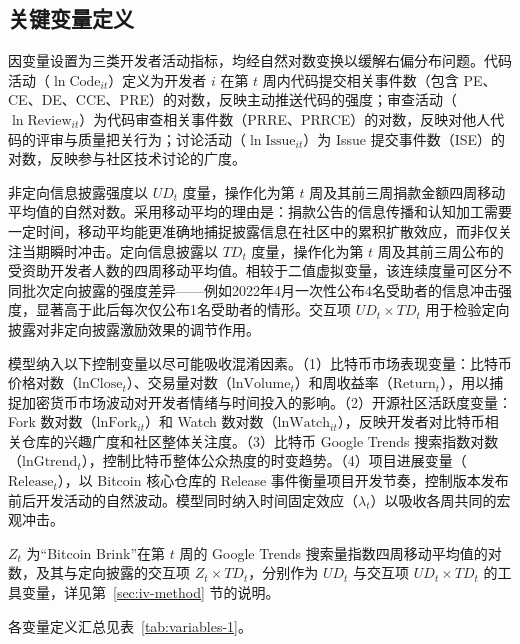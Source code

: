 \subsection{关键变量定义}

因变量设置为三类开发者活动指标，均经自然对数变换以缓解右偏分布问题。代码活动（$\ln\text{Code}_{it}$）定义为开发者 $i$ 在第 $t$ 周内代码提交相关事件数（包含 PE、CE、DE、CCE、PRE）的对数，反映主动推送代码的强度；审查活动（$\ln\text{Review}_{it}$）为代码审查相关事件数（PRRE、PRRCE）的对数，反映对他人代码的评审与质量把关行为；讨论活动（$\ln\text{Issue}_{it}$）为 Issue 提交事件数（ISE）的对数，反映参与社区技术讨论的广度。

非定向信息披露强度以 $UD_t$ 度量，操作化为第 $t$ 周及其前三周捐款金额四周移动平均值的自然对数。采用移动平均的理由是：捐款公告的信息传播和认知加工需要一定时间，移动平均能更准确地捕捉披露信息在社区中的累积扩散效应，而非仅关注当期瞬时冲击。定向信息披露以 $TD_t$ 度量，操作化为第 $t$ 周及其前三周公布的受资助开发者人数的四周移动平均值。相较于二值虚拟变量，该连续度量可区分不同批次定向披露的强度差异——例如2022年4月一次性公布4名受助者的信息冲击强度，显著高于此后每次仅公布1名受助者的情形。交互项 $UD_t \times TD_t$ 用于检验定向披露对非定向披露激励效果的调节作用。

模型纳入以下控制变量以尽可能吸收混淆因素。（1）比特币市场表现变量：比特币价格对数（$\text{lnClose}_t$）、交易量对数（$\text{lnVolume}_t$）和周收益率（$\text{Return}_t$），用以捕捉加密货币市场波动对开发者情绪与时间投入的影响。（2）开源社区活跃度变量：Fork 数对数（$\text{lnFork}_{it}$）和 Watch 数对数（$\text{lnWatch}_{it}$），反映开发者对比特币相关仓库的兴趣广度和社区整体关注度。（3）比特币 Google Trends 搜索指数对数（$\text{lnGtrend}_t$），控制比特币整体公众热度的时变趋势。（4）项目进展变量（$\text{Release}_t$），以 Bitcoin 核心仓库的 Release 事件衡量项目开发节奏，控制版本发布前后开发活动的自然波动。模型同时纳入时间固定效应（$\lambda_t$）以吸收各周共同的宏观冲击。

$Z_t$ 为“Bitcoin Brink”在第 $t$ 周的 Google Trends 搜索量指数四周移动平均值的对数，及其与定向披露的交互项 $Z_t \times TD_t$，分别作为 $UD_t$ 与交互项 $UD_t \times TD_t$ 的工具变量，详见第~\ref{sec:iv-method} 节的说明。

各变量定义汇总见表~\ref{tab:variables-1}。


